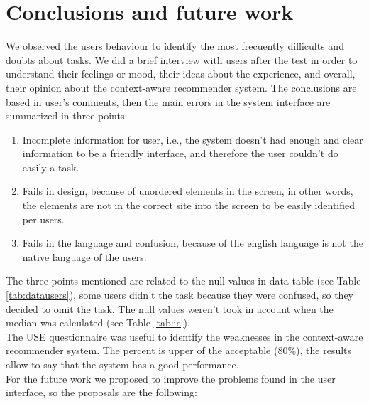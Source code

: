 \chapter{Conclusions and future work} \label{sec:5}

We observed the users behaviour to identify the most frecuently difficults and
doubts about tasks. We did a brief interview with users after the test in order
to understand their  feelings or mood, their ideas about the experience, and
overall, their opinion about the context-aware recommender system.  The
conclusions are based in user's comments, then the main errors in the system
interface are summarized in three points:
\begin{enumerate}  
\item  Incomplete information for user, i.e., the system doesn't had enough and clear information to be a friendly interface, and therefore the user couldn't do easily a task.
\item Fails in design, because of unordered elements in the screen, in other words, the elements are not in the correct site into the screen to be easily identified per users.
\item Fails in the language and confusion, because of the english language is not the native language of the users.
\end{enumerate}

The three points mentioned are related to the null values in data table (see
Table \ref{tab:datausers}), some users didn't the task because they were
confused, so they decided to omit the task. The null values weren't took in
account when the median was calculated (see Table \ref{tab:ic}).\\  The USE
questionnaire was useful to identify the weaknesses in the context-aware
recommender system.  The percent is upper of the acceptable (80\%), the results
allow to say that the system has a good performance. \\ For the future work we
proposed to improve the problems found in the user interface, so the proposals
are the following:

